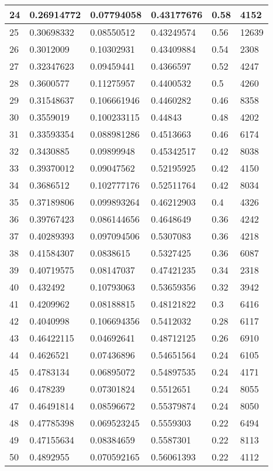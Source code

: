 \begin{longtable}{|l|l|l|l|l|l|}
24 & 0.26914772 & 0.07794058 & 0.43177676 & 0.58 & 4152 \\ \hline 
25 & 0.30698332 & 0.08550512 & 0.43249574 & 0.56 & 12639 \\ \hline 
26 & 0.3012009 & 0.10302931 & 0.43409884 & 0.54 & 2308 \\ \hline 
27 & 0.32347623 & 0.09459441 & 0.4366597 & 0.52 & 4247 \\ \hline 
28 & 0.3600577 & 0.11275957 & 0.4400532 & 0.5 & 4260 \\ \hline 
29 & 0.31548637 & 0.106661946 & 0.4460282 & 0.46 & 8358 \\ \hline 
30 & 0.3559019 & 0.100233115 & 0.44843 & 0.48 & 4202 \\ \hline 
31 & 0.33593354 & 0.088981286 & 0.4513663 & 0.46 & 6174 \\ \hline 
32 & 0.3430885 & 0.09899948 & 0.45342517 & 0.42 & 8038 \\ \hline 
33 & 0.39370012 & 0.09047562 & 0.52195925 & 0.42 & 4150 \\ \hline 
34 & 0.3686512 & 0.102777176 & 0.52511764 & 0.42 & 8034 \\ \hline 
35 & 0.37189806 & 0.099893264 & 0.46212903 & 0.4 & 4326 \\ \hline 
36 & 0.39767423 & 0.086144656 & 0.4648649 & 0.36 & 4242 \\ \hline 
37 & 0.40289393 & 0.097094506 & 0.5307083 & 0.36 & 4218 \\ \hline 
38 & 0.41584307 & 0.0838615 & 0.5327425 & 0.36 & 6087 \\ \hline 
39 & 0.40719575 & 0.08147037 & 0.47421235 & 0.34 & 2318 \\ \hline 
40 & 0.432492 & 0.10793063 & 0.53659356 & 0.32 & 3942 \\ \hline 
41 & 0.4209962 & 0.08188815 & 0.48121822 & 0.3 & 6416 \\ \hline 
42 & 0.4040998 & 0.106694356 & 0.5412032 & 0.28 & 6117 \\ \hline 
43 & 0.46422115 & 0.04692641 & 0.48712125 & 0.26 & 6910 \\ \hline 
44 & 0.4626521 & 0.07436896 & 0.54651564 & 0.24 & 6105 \\ \hline 
45 & 0.4783134 & 0.06895072 & 0.54897535 & 0.24 & 4171 \\ \hline 
46 & 0.478239 & 0.07301824 & 0.5512651 & 0.24 & 8055 \\ \hline 
47 & 0.46491814 & 0.08596672 & 0.55379874 & 0.24 & 8050 \\ \hline 
48 & 0.47785398 & 0.069523245 & 0.5559303 & 0.22 & 6494 \\ \hline 
49 & 0.47155634 & 0.08384659 & 0.5587301 & 0.22 & 8113 \\ \hline 
50 & 0.4892955 & 0.070592165 & 0.56061393 & 0.22 & 4112 \\ \hline 
\end{longtable}